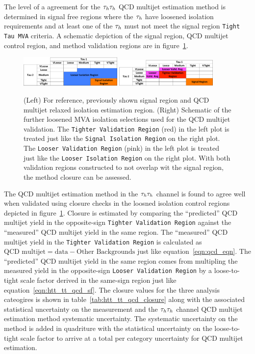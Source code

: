 The level of a agreement for the $\tau_{h}\tau_{h}$ QCD multijet estimation method
is determined in signal free regions where the $\tau_{h}$ have loosened isolation requirements and at least
one of the $\tau_{h}$ must not meet the signal region \texttt{Tight Tau MVA} criteria. A schematic depiction
of the signal region, QCD multijet control region, and method validation regions are in 
figure~\ref{fig:htt_tautau_qcd_schematic2}.

\begin{figure}[htbp]
\centering
     \includegraphics[width=0.45\textwidth]{higgs_to_taus/plots/tautau_QCD_signal_region.pdf}
     \includegraphics[width=0.45\textwidth]{higgs_to_taus/plots/tautau_QCD_closureTestRegions.pdf}\\
     \caption{
(Left) For reference, previously shown signal region and QCD multijet relaxed isolation estimation region.
(Right) Schematic of the further loosened MVA isolation selections used for the QCD multijet validation.
The \texttt{Tighter Validation Region} (red) in the left plot is treated just like the \texttt{Signal Isolation Region}
on the right plot. The \texttt{Looser Validation Region} (pink) in the left plot is treated just like the 
\texttt{Looser Isolation Region} on the right plot. With both validation regions constructed to not overlap wit the
signal region, the method closure can be assessed.
     }
     \label{fig:htt_tautau_qcd_schematic2}
\end{figure}

The QCD multijet estimation method in the $\tau_{h}\tau_{h}$ channel is found to agree well when validated using closure
checks in the loosned isolation control regions depicted in figure~\ref{fig:htt_tautau_qcd_schematic2}.
Closure is estimated by comparing the ``predicted'' QCD multijet yield in the opposite-sign
\texttt{Tighter Validation Region} against the ``measured'' QCD multijet yield in the same region. 
The ``measured'' QCD multijet yield in the \texttt{Tighter Validation Region} is calculated as 
$\text{QCD multijet} = \text{data} - \text{Other Backgrounds}$ just like equation~\ref{eqn:qcd_eqn}.
The ``predicted'' QCD multijet yield in the same region comes from multipling the measured yield in the
opposite-sign \texttt{Looser Validation Region} by a loose-to-tight scale factor derived in the same-sign
region just like equation~\ref{eqn:htt_tt_qcd_sf}. The closure values for the three analysis cateogires
is shown in table~\ref{tab:htt_tt_qcd_closure} along with the associated statistical uncertainty on the
measurement and the $\tau_{h}\tau_{h}$ channel QCD multijet estimation method systematic uncertainty. The 
systematic uncertainty on the method is added in quadriture with the statistical uncertainty on the
loose-to-tight scale factor to arrive at a total per category uncertainty for QCD multijet estimation.


